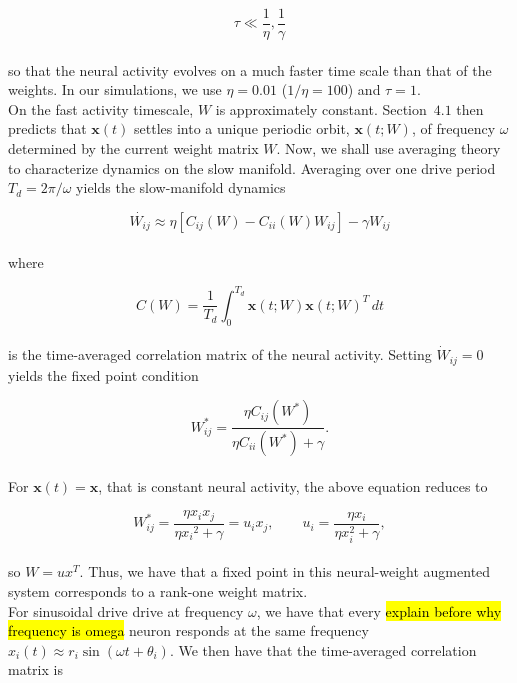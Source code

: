 \documentclass[paper=a4, fontsize=11pt]{scrartcl} %
\numberwithin{equation}{section} %
\numberwithin{figure}{section} %
\numberwithin{table}{section} %
\newcommand \bf[1]{\mathbf #1}
\begin{document}
\begin{equation}
    \tau \ll \frac{1}{\eta}, \frac{1}{\gamma}
\end{equation}
\\
so that the neural activity evolves on a much faster time scale than that of the weights. In our simulations, we use $\eta = 0.01$ ($1/\eta = 100$) and $\tau = 1$. \\

On the fast activity timescale, $W$ is approximately constant. Section~$4.1$ then predicts that $\bf{x}(t)$ settles into a unique periodic orbit, $\bf{x}(t; W)$, of frequency $\omega$ determined by the current weight matrix $W$. Now, we shall use averaging theory to characterize dynamics on the slow manifold. Averaging over one drive period $T_d = 2 \pi / \omega$ yields the slow-manifold dynamics

\begin{equation}
\dot{W_{ij}} \approx \eta[C_{ij}(W) - C_{ii}(W)W_{ij}] - \gamma W_{ij}
\end{equation}
\\
where

\begin{equation}
    C(W) = \frac{1}{T_{d}} \int_{0}^{T_d}\bf{x}(t; W)\bf{x}(t;W)^T \, dt
\end{equation}
\\
is the time-averaged correlation matrix of the neural activity. Setting $\dot{W}_{ij} = 0$ yields the fixed point condition

\begin{equation}
W_{ij}^* = \frac{\eta C_{ij}(W^*)}{\eta C_{ii}(W^*) + \gamma}. 
\end{equation}
\\
For $\bf{x}(t) = \bf{x}$, that is constant neural activity, the above equation reduces to 

\begin{equation}
W_{ij}^* = \frac{\eta x_ix_j}{\eta{x_i}^2 + \gamma} = u_ix_j, \qquad u_i = \frac{\eta x_i}{\eta x_i^2 + \gamma},
\end{equation}
\\
so $W = ux^T$. Thus, we have that a fixed point in this neural-weight augmented system corresponds to a rank-one weight matrix.
\vspace{0.5cm}
\\
For sinusoidal drive drive at frequency $\omega$, we have that every \hl{explain before why frequency is omega} neuron responds at the same frequency $x_i(t) \approx r_i\sin(\omega t + \theta_i)$. We then have that the time-averaged correlation matrix is 
\end{document}
